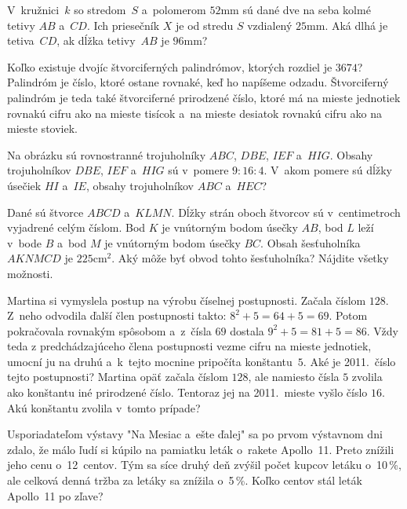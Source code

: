 {%
V~kružnici~$k$ so stredom~$S$ a~polomerom $52\text{mm}$ sú dané dve na seba kolmé
tetivy $AB$ a~$CD$.
Ich priesečník $X$ je od stredu $S$ vzdialený $25\text{mm}$.
Aká dlhá je tetiva~$CD$, ak dĺžka tetivy~$AB$ je $96\text{mm}$?}

{%
Koľko existuje dvojíc štvorciferných palindrómov, ktorých rozdiel je $3674$?
Palindróm je číslo, ktoré ostane rovnaké, keď ho napíšeme odzadu.
Štvorciferný palindróm je teda také štvorciferné prirodzené číslo, ktoré má na mieste jednotiek
rovnakú cifru ako na mieste tisícok a~na mieste desiatok rovnakú cifru ako na
mieste stoviek.
}

{%
Na obrázku sú rovnostranné trojuholníky $ABC$, $DBE$, $IEF$ a~$HIG$.
Obsahy trojuholníkov $DBE$, $IEF$ a~$HIG$ sú v~pomere $9:16:4$. V~akom pomere sú
  dĺžky úsečiek $HI$ a~$IE$,
  obsahy trojuholníkov $ABC$ a~$HEC$?
}

{%
Dané sú štvorce $ABCD$ a~$KLMN$. Dĺžky strán oboch štvorcov sú v~centimetroch
vyjadrené celým číslom. Bod $K$ je vnútorným bodom úsečky $AB$, bod $L$ leží v~bode
$B$ a~bod $M$ je vnútorným bodom úsečky $BC$. Obsah šesťuholníka $AKNMCD$ je
$225\text{cm}^2$.
Aký môže byť obvod tohto šesťuholníka? Nájdite všetky možnosti.
}

{%
Martina si vymyslela postup na výrobu číselnej postupnosti.
Začala číslom $128$.
Z~neho odvodila ďalší člen postupnosti takto: $8^2+5=64+5=69$.
Potom pokračovala rovnakým spôsobom a~z~čísla $69$ dostala $9^2+5=81+5=86$.
Vždy teda z predchádzajúceho člena postupnosti vezme cifru na mieste jednotiek,
umocní ju na druhú a~k~tejto mocnine pripočíta konštantu~$5$.
    Aké je 2011.~číslo tejto postupnosti?
   Martina opäť začala číslom $128$, ale namiesto čísla $5$ zvolila ako
    konštantu iné prirodzené číslo.
    Tentoraz jej na 2011.~mieste vyšlo číslo $16$.
    Akú konštantu zvolila v~tomto prípade?\endgraf
}

{%
Usporiadateľom výstavy "Na Mesiac a~ešte ďalej" sa po prvom výstavnom dni zdalo,
že málo ľudí si kúpilo na pamiatku leták o~rakete Apollo~11. Preto znížili jeho
cenu o~12~centov. Tým sa síce druhý deň zvýšil počet kupcov letáku o~10\,\%, ale
celková denná tržba za letáky sa znížila o~5\,\%.
Koľko centov stál leták Apollo~11 po zľave?}

